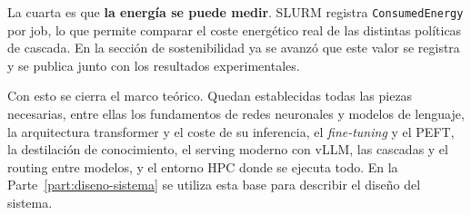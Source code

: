 La cuarta es que \textbf{la energía se puede medir}. SLURM registra \texttt{ConsumedEnergy} por job, lo que permite comparar el coste energético real de las distintas políticas de cascada. En la sección de sostenibilidad ya se avanzó que este valor se registra y se publica junto con los resultados experimentales.

Con esto se cierra el marco teórico. Quedan establecidas todas las piezas necesarias, entre ellas los fundamentos de redes neuronales y modelos de lenguaje, la arquitectura transformer y el coste de su inferencia, el \textit{fine-tuning} y el PEFT, la destilación de conocimiento, el serving moderno con vLLM, las cascadas y el routing entre modelos, y el entorno HPC donde se ejecuta todo. En la Parte~\ref{part:diseno-sistema} se utiliza esta base para describir el diseño del sistema.

